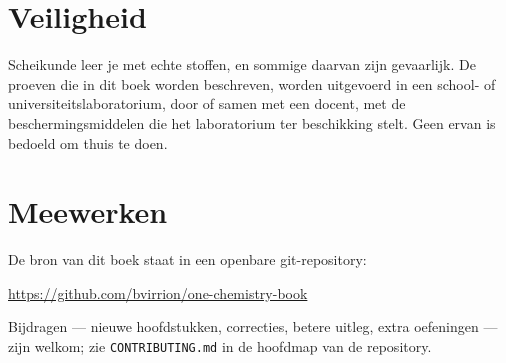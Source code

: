 \section*{Veiligheid}

Scheikunde leer je met echte stoffen, en sommige daarvan zijn gevaarlijk.
De proeven die in dit boek worden beschreven, worden uitgevoerd in een
school- of universiteitslaboratorium, door of samen met een docent, met
de beschermingsmiddelen die het laboratorium ter beschikking stelt. Geen
ervan is bedoeld om thuis te doen.

\section*{Meewerken}

De bron van dit boek staat in een openbare git-repository:
\begin{center}
\url{https://github.com/bvirrion/one-chemistry-book}
\end{center}
Bijdragen --- nieuwe hoofdstukken, correcties, betere uitleg, extra
oefeningen --- zijn welkom; zie \texttt{CONTRIBUTING.md} in de hoofdmap van
de repository.
